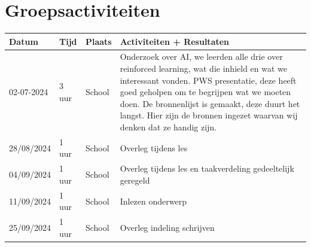 \documentclass[a4paper,11pt]{report}
\begin{document}
\section{Groepsactiviteiten}
\begin{longtable}{|p{}|p{}|p{}|p{}|}
    \hline
    \textbf{Datum} & \textbf{Tijd} & \textbf{Plaats} & \textbf{Activiteiten + Resultaten}                                                                                                                                                                                                                                                                                   \\
    \hline
    02-07-2024     & 3 uur         & School          & Onderzoek over AI, we leerden alle drie over reinforced learning, wat die inhield en wat we interessant vonden. PWS presentatie, deze heeft goed geholpen om te begrijpen wat we moeten doen. De bronnenlijst is gemaakt, deze duurt het langst. Hier zijn de bronnen ingezet waarvan wij denken dat ze handig zijn. \\
    \hline
    28/08/2024     & 1 uur         & School          & Overleg tijdens les                                                                                                                                                                                                                                                                                                  \\
    \hline
    04/09/2024     & 1 uur         & School          & Overleg tijdens les en taakverdeling gedeeltelijk geregeld                                                                                                                                                                                                                                                           \\
    \hline
    11/09/2024     & 1 uur         & School          & Inlezen onderwerp                                                                                                                                                                                                                                                                                                    \\
    \hline
    25/09/2024     & 1 uur         & School          & Overleg indeling schrijven                                                                                                                                                                                                                                                                                           \\

\end{longtable}
\end{document}
